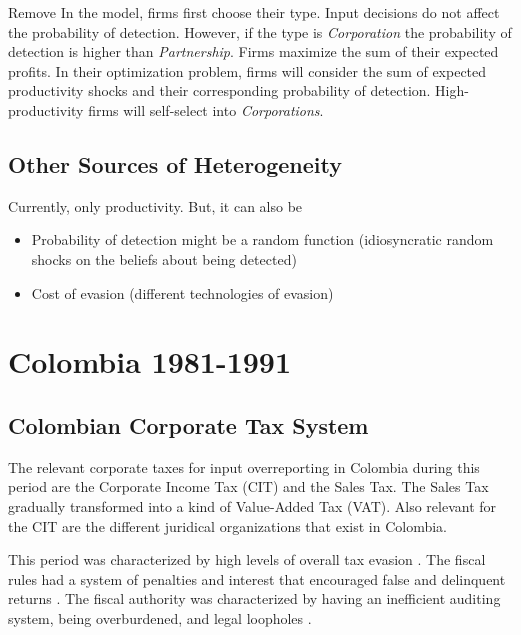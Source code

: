 \documentclass[
  12pt]{article}
\providecommand{\tightlist}{%
  \setlength{\itemsep}{0pt}\setlength{\parskip}{0pt}}\usepackage{longtable,booktabs,array}
\theoremstyle{definition}
\theoremstyle{remark}
\begin{document}
\begin{anfxnote}{Remove}
In the model, firms first choose their type. Input decisions do not
affect the probability of detection. However, if the type is
\emph{Corporation} the probability of detection is higher than
\emph{Partnership}. Firms maximize the sum of their expected profits. In
their optimization problem, firms will consider the sum of expected
productivity shocks and their corresponding probability of detection.
High-productivity firms will self-select into \emph{Corporations}.

\subsection{Other Sources of
Heterogeneity}\label{other-sources-of-heterogeneity}

Currently, only productivity. But, it can also be

\begin{itemize}
\tightlist
\item
  Probability of detection might be a random function (idiosyncratic
  random shocks on the beliefs about being detected)
\item
  Cost of evasion (different technologies of evasion)
\end{itemize}

\end{anfxnote}

\section{Colombia 1981-1991}\label{colombia-1981-1991}

\subsection{Colombian Corporate Tax
System}\label{colombian-corporate-tax-system}

The relevant corporate taxes for input overreporting in Colombia during
this period are the Corporate Income Tax (CIT) and the Sales Tax. The
Sales Tax gradually transformed into a kind of Value-Added Tax (VAT).
Also relevant for the CIT are the different juridical organizations that
exist in Colombia.

This period was characterized by high levels of overall tax evasion
\citep{Sanchez1994}. The fiscal rules had a system of penalties and
interest that encouraged false and delinquent returns
\citep{McLure1989}. The fiscal authority was characterized by having an
inefficient auditing system, being overburdened, and legal loopholes
\citep{Perry1990}.
\end{document}
